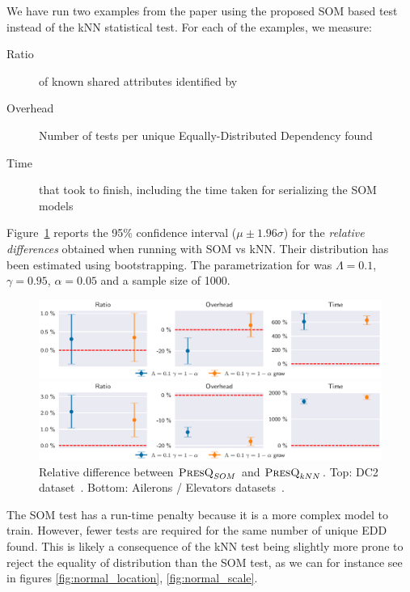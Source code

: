 We have run two examples from the \PresQ paper using the proposed \gls{SOM}  based test
instead of the \gls{kNN} statistical test. For each of the examples, we measure:

\begin{description}
    \item[Ratio] of known shared attributes identified by \PresQ
    \item[Overhead] Number of tests per unique Equally-Distributed Dependency found
    \item[Time] that took \PresQ to finish, including the time taken for serializing the \gls{SOM}  models
\end{description}

Figure~\ref{fig:presq_som} reports the 95\% confidence interval ($\mu \pm 1.96 \sigma$)
for the \emph{relative differences} obtained when running with \gls{SOM}  vs
\gls{kNN}. Their distribution has been estimated using bootstrapping. The parametrization for
\PresQ was $\Lambda = 0.1$, $\gamma=0.95$, $\alpha=0.05$ and a sample size of 1000.

\begin{figure}[ht]
    \centering
    \includegraphics[width=\textwidth]{images/6_som/presq_som.eps}
    
    \includegraphics[width=\textwidth]{images/6_som/presq_som_aileron.eps}
    \caption[Relative difference between $\PresQ_{SOM}$ and $\PresQ_{kNN}$.]{
        Relative difference between $\PresQ_{SOM}$ and $\PresQ_{kNN}$.
        Top: DC2 dataset~\cite{EuclidDesprez2020}.
        Bottom: Ailerons / Elevators datasets~\cite{alcala2011keel}.
    }
    \label{fig:presq_som}
\end{figure}

The \gls{SOM}  test has a run-time penalty because it is a more complex model to train.
However, fewer tests are required for the same number of unique \gls{EDD} found. This is likely a consequence of
the \gls{kNN} test being slightly more prone to reject the equality of distribution than the \gls{SOM} 
test, as we can for instance see in figures \ref{fig:normal_location}, \ref{fig:normal_scale}.


